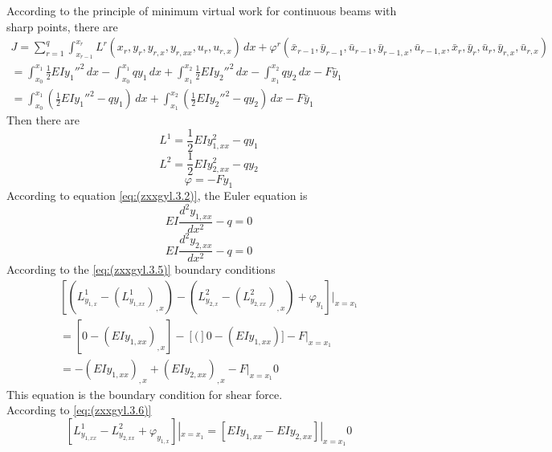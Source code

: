 According to the principle of minimum virtual work for continuous beams with sharp points, there are
\begin{multline}\label{eq:(example.zcwz.1)}
J = \sum_{r=1}^{q}\int_{x_{r-1}}^{x_{r}} L^{r}(x_r,y_r,y_{r,x},y_{r,xx},u_r,u_{r,x})\,dx+\varphi^{r}(\bar {x}_ {r-1},\bar {y}_ {r-1},\bar {u}_ {r-1},\bar {y}_ {r-1,x},\bar {u}_ {r-1,x},\bar {x}_ {r},\bar {y}_ {r},\bar {u}_ {r},\bar {y}_ {r,x},\bar {u}_ {r,x})\\
=\int_{x_0}^{x_1} \frac{1} {2}EIy_1 ''^2\,dx-\int_{x_0}^ {x_1}qy_1 \,dx+\int_{x_1}^{x_2} \frac{1} {2}EIy_2 ''^2\,dx-\int_{x_1}^ {x_2}qy_2 \,dx-F\bar {y}_ {1}
\\=\int_{x_0}^{x_1}( \frac{1} {2}EIy_1 ''^2-qy_1)\,dx+\int_{x_1}^{x_2}( \frac{1} {2}EIy_2 ''^2-qy_2)\,dx-F\bar {y}_ {1}
\end{multline}
Then there are
\begin{equation} \label{eq:(example.zcwz.2)}    
L^1=\frac{1} {2}EIy_ {1,xx}^2-qy_1
\end{equation}
\begin{equation} \label{eq:(example.zcwz.3)}    
L^2=\frac{1} {2}EIy_ {2,xx}^2-qy_2
\end{equation}
\begin{equation} \label{eq:(example.zcwz.4)}    
\varphi=-Fy_{1}
\end{equation}
According to equation \ref{eq:(zxxgyl.3.2)}, the Euler equation is
\begin{equation}\label{eq:example.zcwz.5)}
EI\frac{d^2y_{1,xx}}{dx^2}-q=0
\end{equation}
\begin{equation}\label{eq:(example.zcwz.6)}
EI\frac{d^2y_{2,xx}}{dx^2}-q=0
\end{equation}
According to the \ref{eq:(zxxgyl.3.5)} boundary conditions
\begin{multline} \label{eq:(example.zcwz.8)}    
[(L^ {1}_ {y_{1,x}} -\left(L^ {1}_ {y_{1,xx}}\right)_{,x} )-(L^ {2}_ {y_{2,x}} -\left(L^ {2}_ {y_{2,xx}}\right)_{,x}) + \varphi_{y_{1} }]|_{x=x_1}  
\\=[0-(EIy_{1,xx})_{,x}]-[(]0-(EIy_{1,xx})]-F|_{x=x_1}  \\=-(EIy_{1,xx})_{,x}+(EIy_{2,xx})_{,x}-F|_{x=x_1}
0
\end{multline}
This equation is the boundary condition for shear force.
\\
According to \ref{eq:(zxxgyl.3.6)}
\begin{equation} \label{eq:(example.zcwz.9)}    
[L^ {1}_ {y_{1,xx}} - L^ {2}_ {y_{2,xx}}+\varphi_{y_{1,x}}]|_{x=x_1}   
=[EIy_ {1,xx}-EIy_ {2,xx}]|_{x=x_1}  
0
\end{equation}

